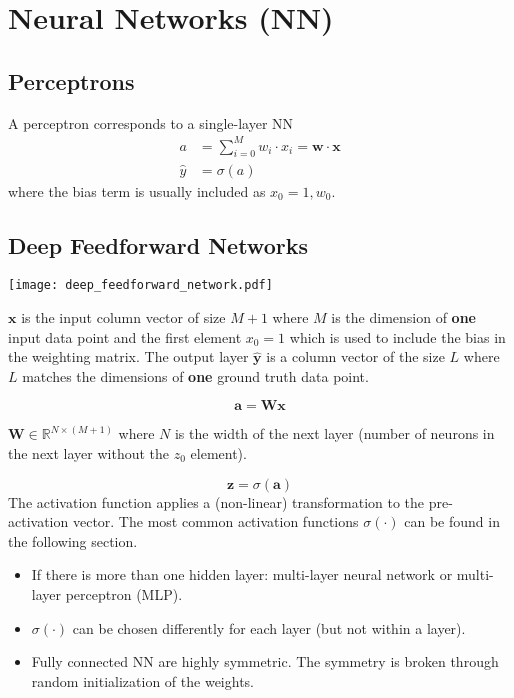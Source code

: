 \section{Neural Networks (NN)}
\subsection{Perceptrons}
A perceptron corresponds to a single-layer NN
\begin{align*}
    a           & =\sum_{i=0}^M w_i\cdot x_i= \mathbf{w}\cdot \mathbf{x} \\
    \widehat{y} & =\sigma(a)
\end{align*}
where the bias term is usually included as $x_0=1,w_0$.
\subsection{Deep Feedforward Networks}

\begin{center}
    \texttt{[image: deep\_feedforward\_network.pdf]}
\end{center}

$\mathbf{x}$ is the input column vector of size $M+1$ where $M$ is the dimension of \textbf{one} input data point and the first element $x_0 = 1$ which is used to include the bias in the weighting matrix.
\newpar{}
The output layer $\hat{\mathbf{y}}$ is a column vector of the size $L$ where $L$ matches the dimensions of \textbf{one} ground truth data point.

\newpar{}
\begin{equation*}
    \mathbf{a} = \mathbf{W} \mathbf{x}
\end{equation*}

$\mathbf{W} \in \mathbb{R}^{N\times (M+1)}$ where $N$ is the width of the next layer (number of neurons in the next layer without the $z_0$ element).

\newpar{}
\begin{equation*}
    \mathbf{z} = \sigma(\mathbf{a})
\end{equation*}
The activation function applies a (non-linear) transformation to the pre-activation vector. The most common activation functions $\sigma(\cdot)$ can be found in the following section.

\newpar{}
\begin{itemize}
    \item If there is more than one hidden layer: multi-layer neural network or multi-layer perceptron (MLP).
    \item $\sigma(\cdot)$ can be chosen differently for each layer (but not within a layer).
    \item Fully connected NN are highly symmetric. The symmetry is broken through random initialization of the weights.
\end{itemize}


